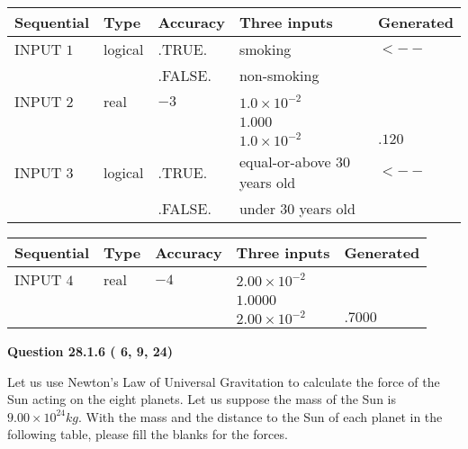 \documentclass[12pt]{article}
\begin{document}
   
  
  
\noindent\begin{tabular}{|l|l|l|l|l|}
\hline
 Sequential & Type & Accuracy & Three inputs & Generated \\ 
\hline
 
 
  INPUT $           1$ & logical & .TRUE. & 
 smoking & 
  $ <-- $ 
  \\
  & & .FALSE. & 
  non-smoking & 
 \\  \hline  
 
 
  INPUT $           2$ & real & $          -3 $ & $
 1.0 \times 10^{-2}
  $ & \\
  & & &  $
 1.000
  $ & \\
  & & &  $
 1.0 \times 10^{-2}
 $ & $ .120 $ 
 \\  \hline  
 
 
  INPUT $           3$ & logical & .TRUE. & 
 equal-or-above 30 years old & 
  $ <-- $ 
  \\
  & & .FALSE. & 
  under 30 years old & 
 \\  \hline  
 \end{tabular}
   
   
  
  
\noindent\begin{tabular}{|l|l|l|l|l|}
\hline
 Sequential & Type & Accuracy & Three inputs & Generated \\ 
\hline
 
 
  INPUT $           4$ & real & $          -4 $ & $
 2.00 \times 10^{-2}
  $ & \\
  & & &  $
 1.0000
  $ & \\
  & & &  $
 2.00 \times 10^{-2}
 $ & $ .7000 $ 
 \\  \hline  
 \end{tabular}
   
   
  
\vspace{0.2in}
  
{\textbf{\Large{Question
28.1.6 
 (          6,          9,         24)
}}}
  
  
Let us use Newton's Law of Universal Gravitation to calculate the force
of the Sun acting on the eight planets. Let us suppose the mass of the
Sun is $ %
9.00 \times 10^{24} kg$. With the mass and the
distance to the Sun of each planet in the following table, please fill
the blanks for the forces.
 
\vspace{0.2in}
 
\end{document}

